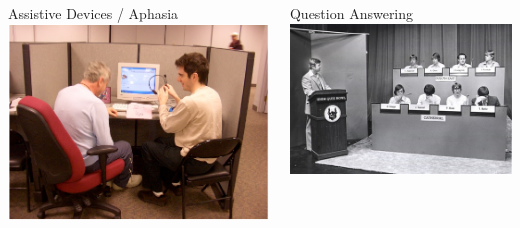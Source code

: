 \documentclass[compress]{beamer}
\begin{document}
{\begin{columns}

    \begin{block}{Assistive Devices / Aphasia}
     \centering
        \includegraphics[width=0.4\linewidth]{evocation/figures/jordan_at_adler} \\
       \cite{boyd-graber-06b,ma-09,nikolova-09}
    \end{block}

    \begin{block}{Question Answering}
      \centering
        \includegraphics[width=0.4\linewidth]{qb/quizbowl} \\
      \cite{boyd-graber-12,Boyd-Graber:Claudino:Socher:III-2014}
    \end{block}

\end{columns}

}
\end{document}
